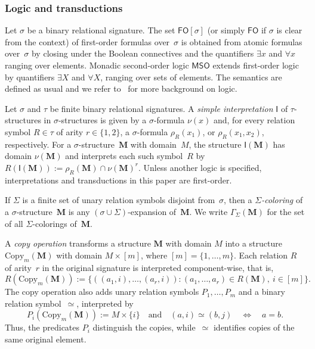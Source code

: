 \documentclass[1p,number,11pt]{elsarticle}
\theoremstyle{plain}
\renewcommand{\FO}{\ensuremath{\mathsf{FO}}}
\newcommand{\MSO}{\ensuremath{\mathsf{MSO}}}
\begin{document}
\subsubsection{Logic and transductions}\label{subsec:logic-transductions}

Let $\sigma$ be a binary relational signature.
The set $\FO[\sigma]$ (or simply $\FO$ if $\sigma$ is clear from the context) of first-order formulas over~$\sigma$ is obtained from atomic formulas over~$\sigma$ by closing under the Boolean connectives and the quantifiers $\exists x$ and $\forall x$ ranging over elements.
Monadic second-order logic $\MSO$ extends first-order logic by quantifiers $\exists X$ and $\forall X$, ranging over sets of elements. 
The semantics are defined as usual and we refer to~\cite{libkin2004elements} for more background on logic. 

Let $\sigma$ and $\tau$ be finite binary relational signatures.
A \emph{simple interpretation} $\mathsf I$ of $\tau$-structures in
$\sigma$-structures is given by a $\sigma$-formula $\nu(x)$ and, for every
relation symbol $R\in\tau$ of arity $r\in\{1,2\}$, a $\sigma$-formula $\rho_R(x_1)$, or $\rho_R(x_1,x_2)$, respectively. For a $\sigma$-structure~$\mathbf M$ with
domain~$M$, the structure $\mathsf I(\mathbf M)$ has domain $\nu(\mathbf M)$
and interprets each such symbol~$R$ by
$ R(\mathsf I(\mathbf M))
 :=\rho_R(\mathbf M)\cap\nu(\mathbf M)^r$.
Unless another logic is specified, interpretations and transductions in this paper are first-order.

If $\Sigma$ is a finite set of unary relation symbols disjoint from~$\sigma$,
then a \emph{$\Sigma$-coloring} of a $\sigma$-structure~$\mathbf M$ is any
$(\sigma\cup\Sigma)$-expansion of~$\mathbf M$.  We write
$\Gamma_\Sigma(\mathbf M)$ for the set of all $\Sigma$-colorings
of~$\mathbf M$.

A \emph{copy operation} transforms a structure $\mathbf M$ with domain $M$
into a structure $\mathrm{Copy}_m(\mathbf M)$ with domain $M\times[m]$,
where $[m]=\{1,\dots,m\}$.  Each relation $R$ of arity~$r$ in the original
signature is interpreted component-wise, that is,
\[
R(\mathrm{Copy}_m(\mathbf M))
   :=
   \bigl\{((a_1,i),\dots,(a_r,i)) :
          (a_1,\dots,a_r)\in R(\mathbf M),\ i\in[m]\bigr\}.
\]
The copy operation also adds unary relation symbols $P_1,\ldots,P_m$ and a
binary relation symbol~$\simeq$, interpreted by
\[
 P_i(\mathrm{Copy}_m(\mathbf M)):=M\times\{i\}
 \quad\text{and}\quad
 (a,i)\simeq(b,j)\quad\Longleftrightarrow\quad a=b.
\]
Thus, the predicates $P_i$ distinguish the copies, while~$\simeq$ identifies
copies of the same original element.
\end{document}

